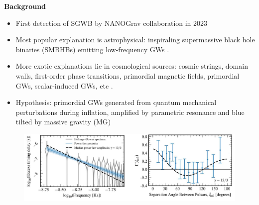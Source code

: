 \documentclass{beamer}                             %
\newcommand{\blocktitle}[1]{{\Large \textbf{#1}}}
\begin{document}
\begin{frame}[t]
\begin{columns}[T]
\begin{column}{0.30\textwidth}
  \begin{tcolorbox}
    \blocktitle{Background}
    \begin{itemize}
        \item First detection of SGWB by NANOGrav collaboration in 2023 \cite{Agazie:2023}
        \item Most popular explanation is astrophysical: inspiraling supermassive black hole binaries (SMBHBs) emitting low-frequency GWs \cite{Burke-Spolaor:2018bvk}.
        \item More exotic explanations lie in cosmological sources: cosmic strings, domain walls, first-order phase transitions, primordial magnetic fields, primordial GWs, scalar-induced GWs, etc \cite{Afzal:2023}.  
        \item Hypothesis: primordial GWs generated from quantum mechanical perturbations during inflation, amplified by parametric resonance and blue tilted by massive gravity (MG)
    \end{itemize}
    \begin{figure}[t]
      \includegraphics[width=\linewidth]{ng15.png}  
      \label{fig:ng15}
    \end{figure}
  \end{tcolorbox}


\end{column}
\end{columns}
\end{frame}
\end{document}
